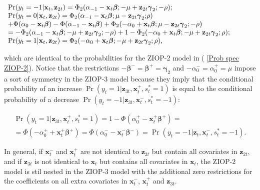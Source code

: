 \documentclass[letterpaper,fleqn,12pt]{article}
\begin{document}
\begin{onehalfspace}
\bigskip

$%
\begin{array}{l}
\Pr (y_{t}=-1|\mathbf{x}_{t},\mathbf{z}_{2t})=\Phi _{2}(\alpha _{-1}-\mathbf{%
x}_{t}\mathbf{\beta };-\mu +\mathbf{z}_{2t}\mathbf{\gamma }_{2}\mathbf{;-}%
\rho ); \\ 
\Pr (y_{t}=0|\mathbf{x}_{t},\mathbf{z}_{2t})=\Phi _{2}(\alpha _{-1}-\mathbf{x%
}_{t}\mathbf{\beta };\mu -\mathbf{z}_{2t}\mathbf{\gamma }_{2}\mathbf{;}\rho )
\\ 
+\Phi (\alpha _{0}-\mathbf{x}_{t}\mathbf{\beta })-\Phi (\alpha _{-1}-\mathbf{%
x}_{t}\mathbf{\beta })+\Phi _{2}(-\alpha _{0}+\mathbf{x}_{t}\mathbf{\beta }%
;\mu -\mathbf{z}_{2t}\mathbf{\gamma }_{2};\mathbf{-}\rho ) \\ 
=-\Phi _{2}(\alpha _{-1}-\mathbf{x}_{t}\mathbf{\beta };-\mu +\mathbf{z}_{2t}%
\mathbf{\gamma }_{2}\mathbf{;-}\rho )+1-\Phi _{2}(-\alpha _{0}+\mathbf{x}_{t}%
\mathbf{\beta };-\mu +\mathbf{z}_{2t}\mathbf{\gamma }_{2};\rho ); \\ 
\Pr (y_{t}=1|\mathbf{x}_{t},\mathbf{z}_{2t})=\Phi _{2}(-\alpha _{0}+\mathbf{x%
}_{t}\mathbf{\beta };-\mu +\mathbf{z}_{2t}\mathbf{\gamma }_{2};\rho ),%
\end{array}%
$

\bigskip

\noindent which are identical to the probabilities for the ZIOP-2 model in (%
\ref{Prob spec ZIOP-2}). Notice that the restrictions $-\mathbf{\beta }^{-}=%
\mathbf{\beta }^{+}=\mathbf{\gamma }_{2}$ and $-\alpha _{0}^{-}=\alpha
_{0}^{+}=\mu $ impose a sort of symmetry in the ZIOP-3 model because they
imply that the conditional probability of an increase $\Pr (y_{t}=1|\mathbf{z%
}_{3t},\mathbf{x}_{t}^{+},s_{t}^{\ast }=1)$ is equal to the conditional
probability of a decrease $\Pr (y_{t}=-1|\mathbf{z}_{3t},\mathbf{x}%
_{t}^{-},s_{t}^{\ast }=-1)$:

\medskip

\begin{gather*}
\Pr (y_{t}=1|\mathbf{z}_{3t},\mathbf{x}_{t}^{+},s_{t}^{\ast }=1)=1-\Phi
(\alpha _{0}^{+}-\mathbf{x}_{t}^{+}\mathbf{\beta }^{+})= \\
=\Phi (-\alpha _{0}^{+}+\mathbf{x}_{t}^{+}\mathbf{\beta }^{+})=\Phi (\alpha
_{0}^{-}-\mathbf{x}_{t}^{-}\mathbf{\beta }^{-})=\Pr (y_{t}=-1|\mathbf{z}_{t},%
\mathbf{x}_{t}^{-},s_{t}^{\ast }=-1)\text{.}
\end{gather*}

\medskip

In general, if $\mathbf{x}_{t}^{-}$ and $\mathbf{x}_{t}^{+}$ are not
identical to $\mathbf{z}_{2t}$ but contain all covariates in $\mathbf{z}%
_{2t} $, and if $\mathbf{z}_{3t}$ is not identical to $\mathbf{x}_{t}$ but
contains all covariates in $\mathbf{x}_{t}$, the ZIOP-2 model is stil nested
in the ZIOP-3 model with the additional zero restrictions for the
coefficients on all extra covariates in $\mathbf{x}_{t}^{-}$, $\mathbf{x}%
_{t}^{+}$ and $\mathbf{z}_{3t}$.


\end{onehalfspace}
\end{document}
